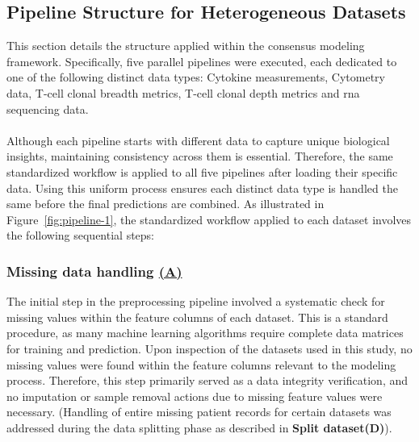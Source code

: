 \documentclass[12pt,a4paper]{report}
\begin{document}
\subsection{Pipeline Structure for Heterogeneous Datasets}
\label{subsec:pipeline_structure_for_heterogeneous_datasets}
\noindent
This section details the structure applied within the consensus modeling framework. Specifically, five parallel pipelines were executed, each dedicated to one of the following distinct data types:
Cytokine measurements, Cytometry data, T-cell clonal breadth metrics, T-cell clonal depth metrics and \acrshort{rna} sequencing data.\\
\\
Although each pipeline starts with different data to capture unique biological insights, maintaining consistency across them is essential. Therefore, the same standardized workflow is applied to all five pipelines after loading their specific data. Using this uniform process ensures each distinct data type is handled the same before the final predictions are combined. As illustrated in Figure~\ref{fig:pipeline-1}, the standardized workflow applied to each dataset involves the following sequential steps:

\subsubsection*{Missing data handling \hyperref[fig:pipeline-1]{(A)}}
The initial step in the preprocessing pipeline involved a systematic check for missing values within the feature columns of each dataset. This is a standard procedure, as many machine learning algorithms require complete data matrices for training and prediction. Upon inspection of the datasets used in this study, no missing values were found within the feature columns relevant to the modeling process. Therefore, this step primarily served as a data integrity verification, and no imputation or sample removal actions due to missing feature values were necessary. (Handling of entire missing patient records for certain datasets was addressed during the data splitting phase as described in \textbf{{Split dataset(D)}}).
\end{document}
